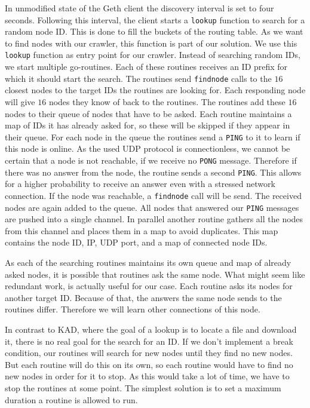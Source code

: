 \documentclass[10pt,conference,final]{IEEEtran}
\begin{document}
In unmodified state of the Geth client the discovery interval is set to four seconds.
Following this interval, the client starts a \texttt{lookup} function to search for a random node ID.
This is done to fill the buckets of the routing table.
As we want to find nodes with our crawler, this function is part of our solution.
We use this \texttt{lookup} function as entry point for our crawler.
Instead of searching random IDs, we start multiple go-routines.
Each of these routines receives an ID prefix for which it should start the search.
The routines send \texttt{findnode} calls to the $16$ closest nodes to the target IDs the routines are looking for.
Each responding node will give $16$ nodes they know of back to the routines.
The routines add these $16$ nodes to their queue of nodes that have to be asked.
Each routine maintains a map of IDs it has already asked for, so these will be skipped if they appear in their queue.
For each node in the queue the routines send a \texttt{PING} to it to learn if this node is online.
As the used UDP protocol is connectionless, we cannot be certain that a node is not reachable, if we receive no \texttt{PONG} message.
Therefore if there was no answer from the node, the routine sends a second \texttt{PING}.
This allows for a higher probability to receive an answer even with a stressed network connection.
If the node was reachable, a \texttt{findnode} call will be send.
The received nodes are again added to the queue.
All nodes that answered our \texttt{PING} messages are pushed into a single channel.
In parallel another routine gathers all the nodes from this channel and places them in a map to avoid duplicates.
This map contains the node ID, IP, UDP port, and a map of connected node IDs.

As each of the searching routines maintains its own queue and map of already asked nodes, it is possible that routines ask the same node.
What might seem like redundant work, is actually useful for our case.
Each routine asks its nodes for another target ID.
Because of that, the answers the same node sends to the routines differ.
Therefore we will learn other connections of this node.

In contrast to KAD, where the goal of a lookup is to locate a file and download it, there is no real goal for the search for an ID.
If we don't implement a break condition, our routines will search for new nodes until they find no new nodes.
But each routine will do this on its own, so each routine would have to find no new nodes in order for it to stop.
As this would take a lot of time, we have to stop the routines at some point.
The simplest solution is to set a maximum duration a routine is allowed to run.
\end{document}
